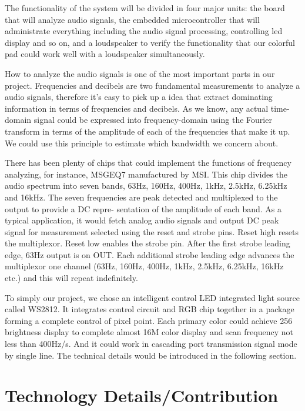 \documentclass[a4paper,journal]{IEEEtran}
\begin{document}
The functionality of the system will be divided in four major units: the board that will analyze audio signals, the embedded microcontroller that will administrate everything including the audio signal processing, controlling led display and so on, and a loudspeaker to verify the functionality that our colorful pad could work well with a loudspeaker simultaneously.

How to analyze the audio signals is one of the most important parts in our project. Frequencies and decibels are two fundamental measurements to analyze a audio signals, therefore it's easy to pick up a idea that extract dominating information in terms of frequencies and decibels. As we know, any actual time-domain signal could be expressed into frequency-domain using the Fourier transform in terms of the amplitude of each of the frequencies that make it up. We could use this principle to estimate which bandwidth we concern about.

There has been plenty of chips that could implement the functions of frequency analyzing, for instance, MSGEQ7 manufactured by MSI. This chip divides the audio spectrum into seven bands, 63Hz, 160Hz, 400Hz, 1kHz, 2.5kHz, 6.25kHz and 16kHz. The seven frequencies are peak detected and multiplexed to the output to provide a DC repre- sentation of the amplitude of each band. As a typical application, it would fetch analog audio signals and output DC peak signal for measurement selected using the reset and strobe pins. Reset high resets the multiplexor. Reset low enables the strobe pin. After the first strobe leading edge, 63Hz output is on OUT. Each additional strobe leading edge advances the multiplexor one channel (63Hz, 160Hz, 400Hz, 1kHz, 2.5kHz, 6.25kHz, 16kHz etc.) and this will repeat indefinitely.

To simply our project, we chose an intelligent control LED integrated light source called WS2812. It integrates control circuit and RGB chip together in a package forming a complete control of pixel point. Each primary color could achieve 256 brightness display to complete almost 16M color display and scan frequency not less than 400Hz/s. And it could work in cascading port transmission signal mode by single line. The technical details would be introduced in the following section.




\section{Technology Details/Contribution}
\end{document}
